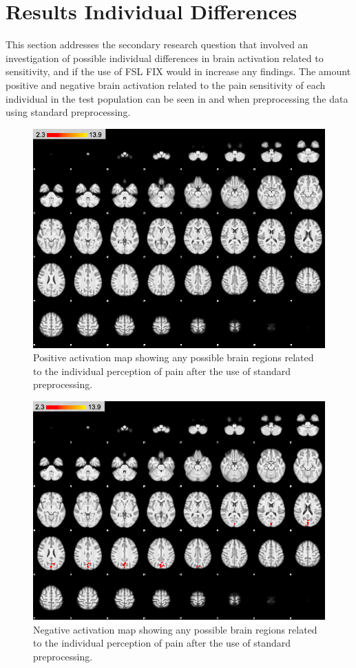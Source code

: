 \section{Results Individual Differences}

This section addresses the secondary research question that involved an investigation of possible individual differences in brain activation related to sensitivity, and if the use of FSL FIX would in increase any findings. The amount positive and negative brain activation related to the pain sensitivity of each individual in the test population can be seen in  and  when preprocessing the data using standard preprocessing.  

\begin{figure}[H]                 
	\includegraphics[width=.65\textwidth]{figures/Results/STD_pos_ID}  
	\caption{Positive activation map showing any possible brain regions related to the individual perception of pain after the use of standard preprocessing. }
	\label{STD_pos_ID} 
\end{figure}

\begin{figure}[H]                 
	\includegraphics[width=.65\textwidth]{figures/Results/STD_neg_ID}  
	\caption{Negative activation map showing any possible brain regions related to the individual perception of pain after the use of standard preprocessing.}
	\label{STD_neg_ID} 
\end{figure}
 

